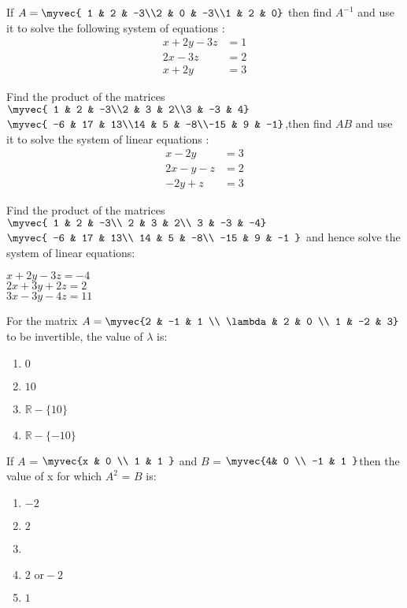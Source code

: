 \item If $A=\myvec{ 1 & 2 & -3\\2 & 0 & -3\\1 & 2 & 0}$ then find $A^{-1}$ and use it to solve the following system of equations :
	\begin{align}  x + 2y -3z&= 1\\
		2x-3z & =2\\
                x+ 2y &=3 \end{align}

\item Find the product of the matrices $\myvec{ 1 & 2 & -3\\2 & 3 & 2\\3 & -3 & 4}$ $\myvec{  -6 & 17 & 13\\14 & 5 & -8\\-15 & 9 & -1}$,then find $AB$ and use it to solve the system of linear equations :
\begin{align} x - 2y &= 3\\2x - y - z &= 2\\-2y + z &= 3\end{align}

\item Find the product of the matrices$\myvec{
    1 & 2 & -3\\
    2 & 3 & 2\\
    3 & -3 & -4}$
$\myvec{
    -6 & 17 & 13\\
    14 & 5 & -8\\
    -15 & 9 & -1
}$ and hence solve the system of linear equations:

$x +2y-3z=-4$\\
$2x+3y+2z=2$\\
$3x-3y-4z=11$



\item For the matrix $A = \myvec{2 & -1 & 1 \\ \lambda & 2 & 0 \\ 1 & -2 & 3}$ to be invertible, the value of $\lambda$ is:
    \begin{enumerate}[label=(\alph*)]
        \item $0$
        \item $10$
        \item $\mathbb{R} - \{10\}$
        \item $\mathbb{R} - \{-10\}$
    \end{enumerate}
    
    \item If $A$ =  $\myvec{x & 0  \\ 1 & 1 }$ and $B$ = $\myvec{4& 0  \\ -1 & 1 }$then the value of x for which $A^2$ = $B$ is:
    \begin{enumerate}[label=(\alph*)]
        \item $-2$
        \item $2$
        \item \item $2 \text{ or} -2$
        \item $1$
    \end{enumerate}
    
